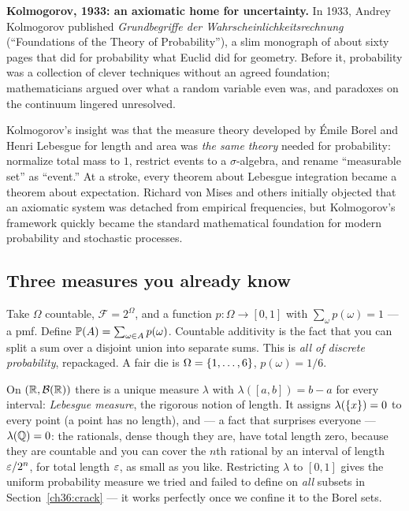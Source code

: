 \begin{historybox}
\textbf{Kolmogorov, 1933: an axiomatic home for uncertainty.}
In 1933, Andrey Kolmogorov published \emph{Grundbegriffe der Wahrscheinlichkeitsrechnung}
(``Foundations of the Theory of Probability''), a slim monograph of about sixty pages that
did for probability what Euclid did for geometry. Before it, probability was a collection
of clever techniques without an agreed foundation; mathematicians argued over what a
random variable even was, and paradoxes on the continuum lingered unresolved.

Kolmogorov's insight was that the measure theory developed by \'Emile Borel and Henri
Lebesgue for length and area was \emph{the same theory} needed for probability: normalize
total mass to $1$, restrict events to a $\sigma$-algebra, and rename ``measurable set'' as
``event.'' At a stroke, every theorem about Lebesgue integration became a theorem about
expectation. Richard von Mises and others initially objected that an axiomatic system was
detached from empirical frequencies, but Kolmogorov's framework quickly became the standard
mathematical foundation for modern probability and stochastic processes.
\end{historybox}

\subsection{Three measures you already know}

\begin{example}
\label{ch36:counting}
Take $\Omega$ countable, $\mathcal{F} = 2^{\Omega}$, and a function
$p : \Omega \to [0,1]$ with $\sum_{\omega} p(\omega) = 1$ --- a pmf. Define
$\P(A) = \sum_{\omega \in A} p(\omega)$. Countable additivity is the fact
that you can split a sum over a disjoint union into separate sums. This is
\emph{all of discrete probability}, repackaged. A fair die is
$\Omega = \set{1,\dots,6}$, $p(\omega) = 1/6$.
\end{example}

\begin{example}
\label{ch36:lebesgue}
On $(\R, \mathcal{B}(\R))$ there is a unique measure $\lambda$ with
$\lambda([a,b]) = b - a$ for every interval: \emph{Lebesgue measure}, the rigorous
notion of length. It assigns $\lambda(\set{x}) = 0$ to every point (a point has no
length), and --- a fact that surprises everyone --- $\lambda(\Q) = 0$: the
rationals, dense though they are, have total length zero, because they are
countable and you can cover the $n$th rational by an interval of length
$\eps/2^n$, for total length $\eps$, as small as you like. Restricting $\lambda$
to $[0,1]$ gives the uniform probability measure we tried and failed to define on
\emph{all} subsets in Section~\ref{ch36:crack} --- it works perfectly once we
confine it to the Borel sets.
\end{example}

